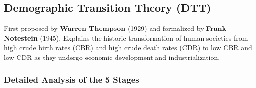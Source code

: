 \documentclass[11pt,a4paper]{article}
\begin{document}
\subsection{Demographic Transition Theory (DTT)}

\begin{modelbox}
First proposed by \textbf{Warren Thompson} (1929) and formalized by \textbf{Frank Notestein} (1945). Explains the historic transformation of human societies from high crude birth rates (CBR) and high crude death rates (CDR) to low CBR and low CDR as they undergo economic development and industrialization.
\end{modelbox}

\subsubsection{Detailed Analysis of the 5 Stages}
\end{document}
